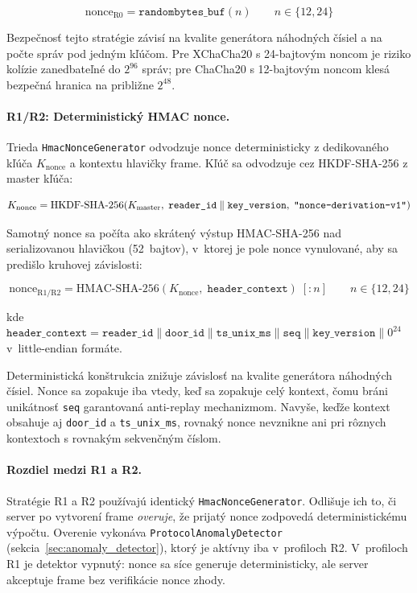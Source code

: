 \documentclass[journal,a4paper,onecolumn]{IEEEtran}
\begin{document}
\begin{equation}
\text{nonce}_{\text{R0}} = \texttt{randombytes\_buf}(n) \qquad n \in \{12, 24\}
\end{equation}

Bezpečnosť tejto stratégie závisí na kvalite generátora náhodných čísiel a na počte správ pod jedným kľúčom. Pre XChaCha20 s 24-bajtovým noncom je riziko kolízie zanedbateľné do $2^{96}$ správ; pre ChaCha20 s 12-bajtovým noncom klesá bezpečná hranica na približne $2^{48}$.

\paragraph{R1/R2: Deterministický HMAC nonce.}
Trieda \texttt{HmacNonceGenerator} odvodzuje nonce deterministicky z dedikovaného kľúča $K_{\text{nonce}}$ a kontextu hlavičky frame. Kľúč sa odvodzuje cez HKDF-SHA-256 z master kľúča:

\begin{equation}
K_{\text{nonce}} = \text{HKDF-SHA-256}(K_{\text{master}},\; \texttt{reader\_id} \parallel \texttt{key\_version},\; \text{\texttt{\char34 nonce-derivation-v1\char34}})
\end{equation}

Samotný nonce sa počíta ako skrátený výstup HMAC-SHA-256 nad serializovanou hlavičkou (52~bajtov), v~ktorej je pole nonce vynulované, aby sa predišlo kruhovej závislosti:

\begin{equation}
\text{nonce}_{\text{R1/R2}} = \text{HMAC-SHA-256}(K_{\text{nonce}},\; \texttt{header\_context})\;[:n] \qquad n \in \{12, 24\}
\end{equation}

kde $\texttt{header\_context} = \texttt{reader\_id} \parallel \texttt{door\_id} \parallel \texttt{ts\_unix\_ms} \parallel \texttt{seq} \parallel \texttt{key\_version} \parallel 0^{24}$ v~little-endian formáte.

Deterministická konštrukcia znižuje závislosť na kvalite generátora náhodných čísiel\cite{BellareNonceMisuse2006}. Nonce sa zopakuje iba vtedy, keď sa zopakuje celý kontext, čomu bráni unikátnosť \texttt{seq} garantovaná anti-replay mechanizmom. Navyše, keďže kontext obsahuje aj \texttt{door\_id} a \texttt{ts\_unix\_ms}, rovnaký nonce nevznikne ani pri rôznych kontextoch s rovnakým sekvenčným číslom.

\paragraph{Rozdiel medzi R1 a R2.}
Stratégie R1 a R2 používajú identický \texttt{HmacNonceGenerator}. Odlišuje ich to, či server po vytvorení frame \emph{overuje}, že prijatý nonce zodpovedá deterministickému výpočtu. Overenie vykonáva \texttt{ProtocolAnomalyDetector} (sekcia~\ref{sec:anomaly_detector}), ktorý je aktívny iba v~profiloch R2. V~profiloch R1 je detektor vypnutý: nonce sa síce generuje deterministicky, ale server akceptuje frame bez verifikácie nonce zhody.
\end{document}
